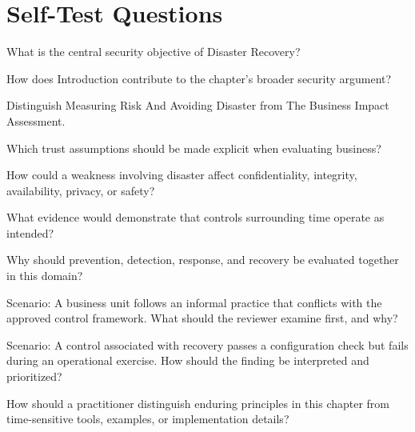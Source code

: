 \documentclass[11pt,letterpaper]{article}
\begin{document}
\section*{Self-Test Questions}
\begin{CornellRecallList}
\item What is the central security objective of Disaster Recovery?
\item How does Introduction contribute to the chapter's broader security argument?
\item Distinguish Measuring Risk And Avoiding Disaster from The Business Impact Assessment.
\item Which trust assumptions should be made explicit when evaluating business?
\item How could a weakness involving disaster affect confidentiality, integrity, availability, privacy, or safety?
\item What evidence would demonstrate that controls surrounding time operate as intended?
\item Why should prevention, detection, response, and recovery be evaluated together in this domain?
\item Scenario: A business unit follows an informal practice that conflicts with the approved control framework. What should the reviewer examine first, and why?
\item Scenario: A control associated with recovery passes a configuration check but fails during an operational exercise. How should the finding be interpreted and prioritized?
\item How should a practitioner distinguish enduring principles in this chapter from time-sensitive tools, examples, or implementation details?
\end{CornellRecallList}
\end{document}
